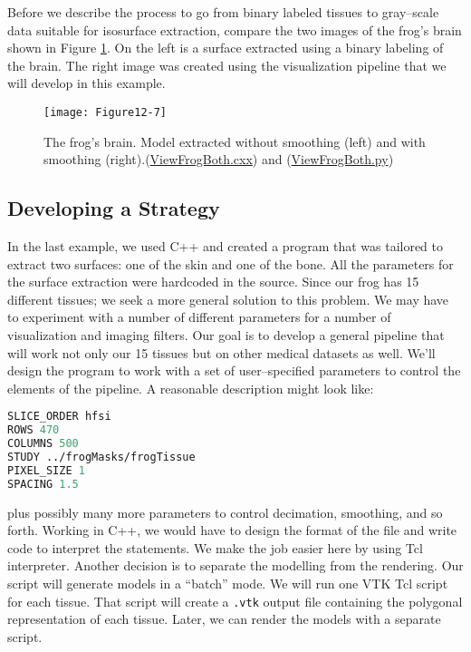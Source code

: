 Before we describe the process to go from binary labeled tissues to gray--scale data suitable for isosurface extraction, compare the two images of the frog's brain shown in Figure \ref{fig:Figure12-7}. On the left is a surface extracted using a binary labeling of the brain. The right image was created using the visualization pipeline that we will develop in this example.

\begin{figure}[!htb]
	\centering
	\texttt{[image: Figure12-7]}
	\caption{The frog's brain. Model extracted without smoothing (left) and with smoothing (right).(\href{https://lorensen.github.io/VTKExamples/site/Cxx/Visualization/ViewFrogBoth/}{ViewFrogBoth.cxx}) and (\href{https://lorensen.github.io/VTKExamples/site/Python/Visualization/ViewFrogBoth/}{ViewFrogBoth.py})}
	\label{fig:Figure12-7}
\end{figure}

\subsection{Developing a Strategy}

In the last example, we used C++ and created a program that was tailored to extract two surfaces: one of the skin and one of the bone. All the parameters for the surface extraction were hardcoded in the source. Since our frog has 15 different tissues; we seek a more general solution to this problem. We may have to experiment with a number of different parameters for a number of visualization and imaging filters. Our goal is to develop a general pipeline that will work not only our 15 tissues but on other medical datasets as well. We'll design the program to work with a set of user--specified parameters to control the elements of the pipeline. A reasonable description might look like:

\begin{lstlisting}[language=TCL, caption={User specified parameters to control the elements of the pipeline.}]
SLICE_ORDER hfsi
ROWS 470
COLUMNS 500
STUDY ../frogMasks/frogTissue
PIXEL_SIZE 1
SPACING 1.5
\end{lstlisting}

plus possibly many more parameters to control decimation, smoothing, and so forth. Working in C++, we would have to design the format of the file and write code to interpret the statements. We make the job easier here by using Tcl interpreter. Another decision is to separate the modelling from the rendering. Our script will generate models in a ``batch'' mode. We will run one VTK Tcl script for each tissue. That script will create a \texttt{.vtk} output file containing the polygonal representation of each tissue. Later, we can render the models with a separate script.

